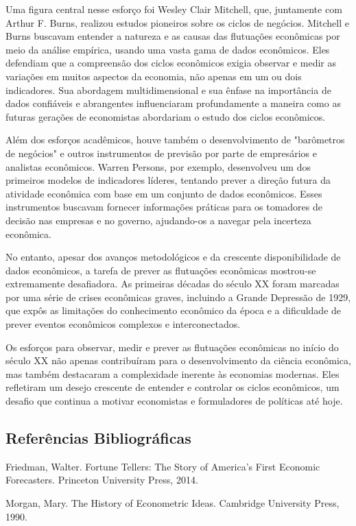 \documentclass[12pt]{article}
\begin{document}
Uma figura central nesse esforço foi Wesley Clair Mitchell, que, juntamente com Arthur F. Burns, realizou estudos pioneiros sobre os ciclos de negócios. Mitchell e Burns buscavam entender a natureza e as causas das flutuações econômicas por meio da análise empírica, usando uma vasta gama de dados econômicos. Eles defendiam que a compreensão dos ciclos econômicos exigia observar e medir as variações em muitos aspectos da economia, não apenas em um ou dois indicadores. Sua abordagem multidimensional e sua ênfase na importância de dados confiáveis e abrangentes influenciaram profundamente a maneira como as futuras gerações de economistas abordariam o estudo dos ciclos econômicos.

Além dos esforços acadêmicos, houve também o desenvolvimento de "barômetros de negócios" e outros instrumentos de previsão por parte de empresários e analistas econômicos. Warren Persons, por exemplo, desenvolveu um dos primeiros modelos de indicadores líderes, tentando prever a direção futura da atividade econômica com base em um conjunto de dados econômicos. Esses instrumentos buscavam fornecer informações práticas para os tomadores de decisão nas empresas e no governo, ajudando-os a navegar pela incerteza econômica.

No entanto, apesar dos avanços metodológicos e da crescente disponibilidade de dados econômicos, a tarefa de prever as flutuações econômicas mostrou-se extremamente desafiadora. As primeiras décadas do século XX foram marcadas por uma série de crises econômicas graves, incluindo a Grande Depressão de 1929, que expôs as limitações do conhecimento econômico da época e a dificuldade de prever eventos econômicos complexos e interconectados.

Os esforços para observar, medir e prever as flutuações econômicas no início do século XX não apenas contribuíram para o desenvolvimento da ciência econômica, mas também destacaram a complexidade inerente às economias modernas. Eles refletiram um desejo crescente de entender e controlar os ciclos econômicos, um desafio que continua a motivar economistas e formuladores de políticas até hoje.

\subsection{\textbf{Referências Bibliográficas}}
Friedman, Walter. Fortune Tellers: The Story of America's First Economic Forecasters.
Princeton University Press, 2014.

Morgan, Mary. The History of Econometric Ideas. Cambridge University Press, 1990.
\end{document}
